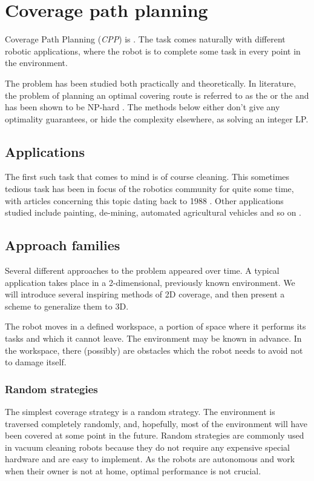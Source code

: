 \documentclass[buriama8_dp.tex]{subfiles}
\begin{document}
\chapter{Coverage path planning}
\label{chap:cpp}

Coverage Path Planning (\textit{CPP}) is . The task comes naturally with different robotic applications, where the robot is to complete some task in every point in the environment.

The problem has been studied both practically and theoretically. In literature, the problem of planning an optimal covering route is referred to as the  or the  and has been shown to be NP-hard \cite{lawnmowing}. The methods below either don't give any optimality guarantees, or hide the complexity elsewhere, as solving an integer LP.

\section{Applications}
The first such task that comes to mind is of course cleaning. This sometimes tedious task has been in focus of the robotics community for quite some time, with articles concerning this topic dating back to 1988 \cite{cleaning88}. Other applications studied include painting, de-mining, automated agricultural vehicles and so on \cite[sec.~1]{survey13}.


\section{Approach families}

Several different approaches to the problem appeared over time. A typical application takes place in a 2-dimensional, previously known environment. We will introduce several inspiring methods of 2D coverage, and then present a scheme to generalize them to 3D.

The robot moves in a defined workspace, a portion of space where it performs its tasks and which it cannot leave. The environment may be known in advance. In the workspace, there (possibly) are obstacles which the robot needs to avoid not to damage itself.

\subsection{Random strategies}
\label{subsec:random_cpp}
The simplest coverage strategy is a random strategy. The environment is traversed completely randomly, and, hopefully, most of the environment will have been covered at some point in the future. Random strategies are commonly used in vacuum cleaning robots because they do not require any expensive special hardware and are easy to implement. As the robots are autonomous and work when their owner is not at home, optimal performance is not crucial.
\end{document}
